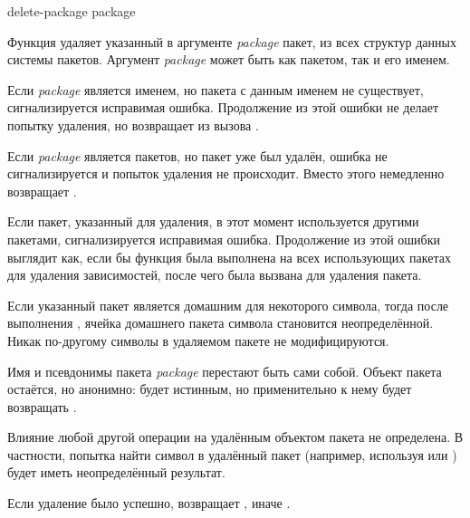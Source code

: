 \begin{defun}[Функция]
delete-package package

Функция  удаляет указанный в аргументе \emph{package} пакет,
из всех структур данных системы пакетов.
Аргумент \emph{package} может быть как пакетом, так и его именем.

Если \emph{package} является именем, но пакета с данным именем не существует,
сигнализируется исправимая ошибка. Продолжение из этой ошибки не делает попытку
удаления, но возвращает  из вызова .

Если \emph{package} является пакетов, но пакет уже был удалён,
ошибка не сигнализируется и попыток удаления не происходит. Вместо этого
 немедленно возвращает .

Если пакет, указанный для удаления, в этот момент используется другими пакетами,
сигнализируется исправимая ошибка. Продолжение из этой ошибки выглядит как, если
бы функция  была выполнена на всех использующих пакетах для
удаления зависимостей, после чего была вызвана  для удаления
пакета.

Если указанный пакет является домашним для некоторого символа, тогда после
выполнения , ячейка домашнего пакета символа становится
неопределённой. Никак по-другому символы в удаляемом пакете не модифицируются.

Имя и псевдонимы пакета \emph{package} перестают быть сами собой. Объект пакета
остаётся, но анонимно:  будет истинным, но 
применительно к нему будет возвращать .

Влияние любой другой операции на удалённым объектом пакета не определена. В
частности, попытка найти символ в удалённый пакет (например, используя 
или ) будет иметь неопределённый результат.

Если удаление было успешно,  возвращает , иначе .
\end{defun}

